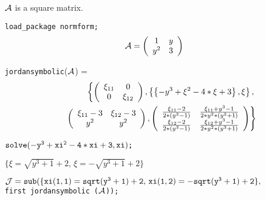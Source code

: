 ${\cal A}$ is a square matrix.

{\tt load\_package normform;}\\

\begin{displaymath}
{\cal A} = \left( \begin{array}{cc} 1 & y \\ y^2 & 3  \end{array}
\right)
\end{displaymath}

{\tt jordansymbolic}(${\cal A}$) =
\begin{eqnarray}
 & & \left\{ \left( \begin{array}{cc} \xi_{11} & 0 \\ 0 & \xi_{12}
\end{array} \right) ,
\left\{ \left\{ -y^3+\xi^2-4*\xi+3 \right\}, \xi \right\}, \right.
\nonumber \\ & & \hspace{0.1in} \left. \left( \begin{array}{cc}
\xi_{11} -3 & \xi_{12} -3 \\ y^2 & y^2
\end{array} \right), \left( \begin{array}{cc} \frac{\xi_{11} -2}
{2*(y^3-1)} & \frac{\xi_{11} + y^3 -1}{2*y^2*(y^3+1)} \\
\frac{\xi_{12} -2}{2*(y^3-1)} & \frac{\xi_{12}+y^3-1}{2*y^2*(y^3+1)}
\end{array} \right) \right\} \nonumber
\end{eqnarray}

\vspace{0.2in}
\begin{flushleft}
\begin{math}
{\tt solve(-y^3+xi^2-4*xi+3,xi)}${\tt ;}$
\end{math}
\end{flushleft}

\vspace{0.1in}
\begin{center}
\begin{math}
\{ \xi = \sqrt{y^3+1} + 2,\, \xi = -\sqrt{y^3+1}+2 \}
\end{math}
\end{center}

\vspace{0.1in}
\begin{math}
{\tt {\cal J}  = sub}{\tt (}{\tt \{ xi(1,1)=sqrt(y^3+1)+2,\, xi(1,2) =
-sqrt(y^3+1)+2\},}
\end{math}
\\ \hspace*{0.29in} {\tt first  jordansymbolic (${\cal A}$));}


